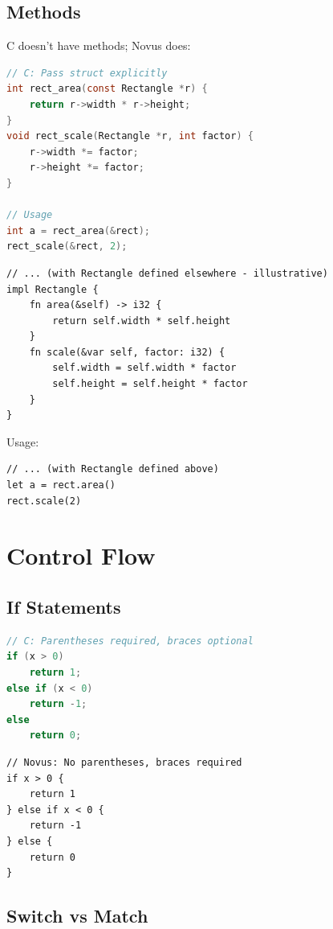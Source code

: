 \subsection{Methods}

C doesn't have methods; Novus does:

\begin{lstlisting}[language=C]
// C: Pass struct explicitly
int rect_area(const Rectangle *r) {
    return r->width * r->height;
}
void rect_scale(Rectangle *r, int factor) {
    r->width *= factor;
    r->height *= factor;
}

// Usage
int a = rect_area(&rect);
rect_scale(&rect, 2);
\end{lstlisting}

\begin{lstlisting}
// ... (with Rectangle defined elsewhere - illustrative)
impl Rectangle {
    fn area(&self) -> i32 {
        return self.width * self.height
    }
    fn scale(&var self, factor: i32) {
        self.width = self.width * factor
        self.height = self.height * factor
    }
}
\end{lstlisting}

Usage:

\begin{lstlisting}
// ... (with Rectangle defined above)
let a = rect.area()
rect.scale(2)
\end{lstlisting}

\section{Control Flow}

\subsection{If Statements}

\begin{lstlisting}[language=C]
// C: Parentheses required, braces optional
if (x > 0)
    return 1;
else if (x < 0)
    return -1;
else
    return 0;
\end{lstlisting}

\begin{lstlisting}
// Novus: No parentheses, braces required
if x > 0 {
    return 1
} else if x < 0 {
    return -1
} else {
    return 0
}
\end{lstlisting}

\subsection{Switch vs Match}

